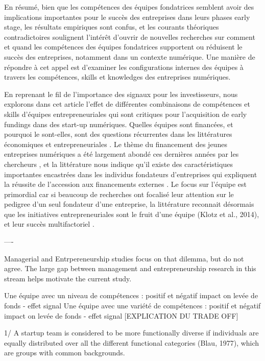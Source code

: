 \documentclass[11pt]{article}
\begin{document}
En résumé, bien que les compétences des équipes fondatrices semblent avoir des implications importantes pour le succès des entreprises dans leurs phases early stage, les résultats empiriques sont confus, et les courants théoriques contradictoires soulignent l'intérêt d'ouvrir de nouvelles recherches sur comment et quand les compétences des équipes fondatrices supportent ou réduisent le succès des entreprises, notamment dans un contexte numérique. Une manière de répondre à cet appel est d'examiner les configurations internes des équipes à travers les compétences, skills et knowledges des entreprises numériques.

En reprenant le fil de l'importance des signaux pour les investisseurs, nous explorons dans cet article l'effet de différentes combinaisons de compétences et skills d'équipes entrepreneuriales qui sont critiques pour l'acquisition de early fundings dans des start-up numériques. Quelles équipes sont financées, et pourquoi le sont-elles, sont des questions récurrentes dans les littératures économiques et entrepreneuriales \citep{knight2020start}. Le thème du financement des jeunes entreprises numériques a été largement abondé ces dernières années par les chercheurs \citep{klein2020start}, et la littérature nous indique qu'il existe des caractéristiques importantes encastrées dans les individus fondateurs d'entreprises qui expliquent la réussite de l'accession aux financements externes \citep{pinelli2020too, reese2020should}. Le focus sur l'équipe est primordial car si beaucoup de recherches ont focalisé leur attention sur le pedigree d'un seul fondateur d'une entreprise, la littérature reconnait désormais que les initiatives entrepreneuriales sont le fruit d'une équipe (Klotz et al., 2014), et leur succès multifactoriel \citep{roure1990predictors}.

----

Managerial and Entrpereneurship studies focus on that dilemma, but do not agree. The large gap between management and entrepreneurship research in this stream helps motivate the current study.

Une équipe avec un niveau de compétences : positif et négatif impact on levée de fonds - effet signal
Une équipe avec une variété de compétences : positif et négatif impact on levée de fonds - effet signal
[EXPLICATION DU TRADE OFF]

1/ A startup team is considered to be more functionally diverse if individuals are equally distributed over all the different functional categories (Blau, 1977), which are groups with common backgrounds.
\end{document}

